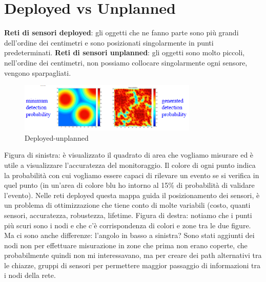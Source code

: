 \documentclass[12pt,italian]{report}
\begin{document}
\section{Deployed vs Unplanned}
\label{sec:depunp}
\noindent \textbf{Reti di sensori deployed}: gli oggetti che ne fanno parte sono più grandi dell'ordine dei centimetri e sono posizionati singolarmente in punti predeterminati.
\bigbreak
\noindent \textbf{Reti di sensori unplanned}: gli oggetti sono molto piccoli, nell'ordine dei centimetri, non possiamo collocare singolarmente ogni sensore, vengono sparpagliati. 

\begin{figure}[h]
	\centering
    \includegraphics[width=85mm]{img/depun.PNG}
    \caption{Deployed-unplanned}
    \label{fig:du}
\end{figure}

Figura di sinistra: è visualizzato il quadrato di area che vogliamo misurare ed è utile a visualizzare l'accuratezza del monitoraggio. Il colore di ogni punto indica la probabilità con cui vogliamo essere capaci di rilevare un evento se si verifica in quel punto (in un'area di colore blu ho intorno al 15\% di probabilità di validare l'evento).
Nelle reti deployed questa mappa guida il posizionamento dei sensori, è un problema di ottimizzazione che tiene conto di molte variabili (costo, quanti sensori, accuratezza, robustezza, lifetime.
\bigbreak
Figura di destra: notiamo che i punti più scuri sono i nodi e che c'è corrispondenza di colori e zone tra le due figure. Ma ci sono anche differenze: l'angolo in basso a sinistra? Sono stati aggiunti dei nodi non per effettuare misurazione in zone che prima non erano coperte, che probabilmente quindi non mi interessavano, ma per creare dei path alternativi tra le chiazze, gruppi di sensori per permettere maggior passaggio di informazioni tra i nodi della rete. 
\end{document}
